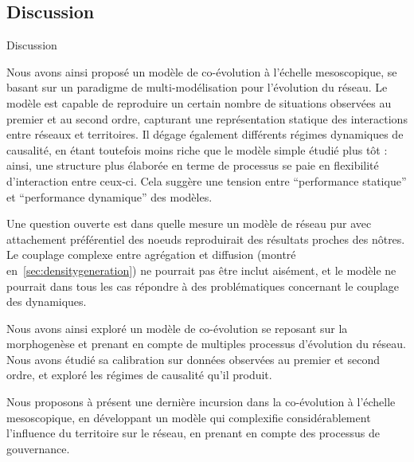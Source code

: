 \subsection{Discussion}{Discussion}


Nous avons ainsi proposé un modèle de co-évolution à l'échelle mesoscopique, se basant sur un paradigme de multi-modélisation pour l'évolution du réseau. Le modèle est capable de reproduire un certain nombre de situations observées au premier et au second ordre, capturant une représentation statique des interactions entre réseaux et territoires. Il dégage également différents régimes dynamiques de causalité, en étant toutefois moins riche que le modèle simple étudié plus tôt : ainsi, une structure plus élaborée en terme de processus se paie en flexibilité d'interaction entre ceux-ci. Cela suggère une tension entre ``performance statique'' et ``performance dynamique'' des modèles.


Une question ouverte est dans quelle mesure un modèle de réseau pur avec attachement préférentiel des noeuds reproduirait des résultats proches des nôtres. Le couplage complexe entre agrégation et diffusion (montré en~\ref{sec:densitygeneration}) ne pourrait pas être inclut aisément, et le modèle ne pourrait dans tous les cas répondre à des problématiques concernant le couplage des dynamiques.



\stars

Nous avons ainsi exploré un modèle de co-évolution se reposant sur la morphogenèse et prenant en compte de multiples processus d'évolution du réseau. Nous avons étudié sa calibration sur données observées au premier et second ordre, et exploré les régimes de causalité qu'il produit.


Nous proposons à présent une dernière incursion dans la co-évolution à l'échelle mesoscopique, en développant un modèle qui complexifie considérablement l'influence du territoire sur le réseau, en prenant en compte des processus de gouvernance. 


\stars






